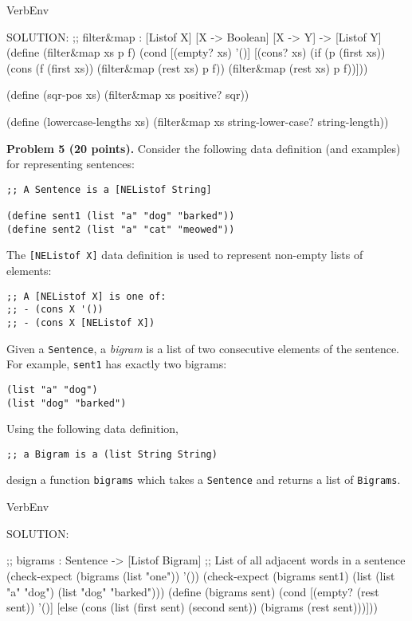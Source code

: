 \documentclass[12pt]{article}
\begin{document}
\begin{SaveVerbatim}{VerbEnv}

SOLUTION:
;; filter&map : [Listof X] [X -> Boolean] [X -> Y] -> [Listof Y]
(define (filter&map xs p f)
  (cond [(empty? xs) '()]
        [(cons? xs)
         (if (p (first xs))
             (cons (f (first xs))
                   (filter&map (rest xs) p f))
             (filter&map (rest xs) p f))]))

(define (sqr-pos xs)
  (filter&map xs positive? sqr))

(define (lowercase-lengths xs)
  (filter&map xs string-lower-case? string-length))
\end{SaveVerbatim}


\newpage



\newpage

\noindent
{\bf Problem 5 (20 points).}
%
Consider the following data definition (and examples) for representing sentences:
\begin{verbatim}
;; A Sentence is a [NEListof String]

(define sent1 (list "a" "dog" "barked"))
(define sent2 (list "a" "cat" "meowed"))
\end{verbatim}
The {\tt [NEListof X]} data definition is used to represent 
non-empty lists of elements:
\begin{verbatim}
;; A [NEListof X] is one of:
;; - (cons X '())
;; - (cons X [NEListof X])
\end{verbatim}
Given a {\tt Sentence}, a \emph{bigram} is a list of two consecutive
elements of the sentence. For example, {\tt sent1} has exactly two
bigrams:
\begin{verbatim}
(list "a" "dog")
(list "dog" "barked")
\end{verbatim}
Using the following data definition,
\begin{verbatim}
;; a Bigram is a (list String String)
\end{verbatim}
design a function {\tt bigrams} which takes a {\tt Sentence} and
returns a list of {\tt Bigrams}.

\begin{SaveVerbatim}{VerbEnv}


SOLUTION:

;; bigrams : Sentence -> [Listof Bigram]
;; List of all adjacent words in a sentence
(check-expect (bigrams (list "one")) '())
(check-expect (bigrams sent1)
              (list (list "a" "dog") (list "dog" "barked")))
(define (bigrams sent)
  (cond [(empty? (rest sent)) '()]
        [else
         (cons (list (first sent) (second sent))
               (bigrams (rest sent)))]))
\end{SaveVerbatim}


\newpage
{}
\end{document}
